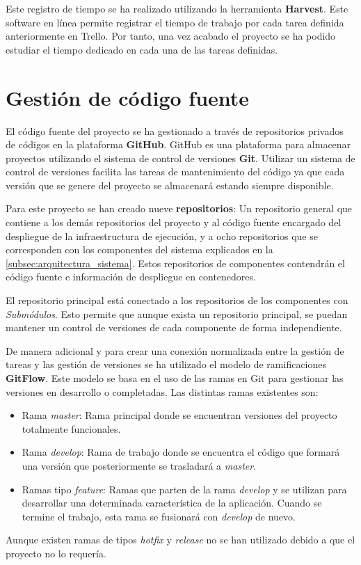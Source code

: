\documentclass[../main.tex]{subfiles}
\begin{document}
Este registro de tiempo se ha realizado utilizando la herramienta \textbf{Harvest}\cite{}. Este software en línea permite registrar el tiempo de trabajo por cada tarea definida anteriormente en Trello. Por tanto, una vez acabado el proyecto se ha podido estudiar el tiempo dedicado en cada una de las tareas definidas.

\section{Gestión de código fuente}
El código fuente del proyecto se ha gestionado a través de repositorios privados de códigos en la plataforma \textbf{GitHub}\cite{}. GitHub es una plataforma para almacenar proyectos utilizando el sistema de control de versiones \textbf{Git}\cite{}. Utilizar un sistema de control de versiones facilita las tareas de mantenimiento del código ya que cada versión que se genere del proyecto se almacenará estando siempre disponible.

Para este proyecto se han creado nueve \textbf{repositorios}: Un repositorio general que contiene a los demás repositorios del proyecto y al código fuente encargado del despliegue de la infraestructura de ejecución, y a ocho repositorios que se corresponden con los componentes del sistema explicados en la \autoref{subsec:arquitectura_sistema}. Estos repositorios de componentes contendrán el código fuente e información de despliegue en contenedores.

El repositorio principal está conectado a los repositorios de los componentes con \textit{Submódulos}. Esto permite que aunque exista un repositorio principal, se puedan mantener un control de versiones de cada componente de forma independiente.

De manera adicional y para crear una conexión normalizada entre la gestión de tareas y las gestión de versiones se ha utilizado el modelo de ramificaciones \textbf{GitFlow}. Este modelo se basa en el uso de las ramas en Git para gestionar las versiones en desarrollo o completadas. Las distintas ramas existentes son:
\begin{itemize}
    \item Rama \textit{master}: Rama principal donde se encuentran versiones del proyecto totalmente funcionales.
    \item Rama \textit{develop}: Rama de trabajo donde se encuentra el código que formará una versión que posteriormente se trasladará a \textit{master}.
    \item Ramas tipo \textit{feature}: Ramas que parten de la rama \textit{develop} y se utilizan para desarrollar una determinada característica de la aplicación. Cuando se termine el trabajo, esta rama se fusionará con \textit{develop} de nuevo. 
\end{itemize}
Aunque existen ramas de tipos \textit{hotfix} y \textit{release} no se han utilizado debido a que el proyecto no lo requería.
\end{document}
